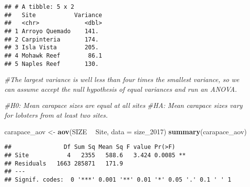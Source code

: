 \documentclass[]{article}
\newenvironment{Shaded}{\begin{snugshade}}{\end{snugshade}}
\newcommand{\KeywordTok}[1]{\textcolor[rgb]{0.13,0.29,0.53}{\textbf{#1}}}
\newcommand{\DataTypeTok}[1]{\textcolor[rgb]{0.13,0.29,0.53}{#1}}
\newcommand{\DecValTok}[1]{\textcolor[rgb]{0.00,0.00,0.81}{#1}}
\newcommand{\StringTok}[1]{\textcolor[rgb]{0.31,0.60,0.02}{#1}}
\newcommand{\CommentTok}[1]{\textcolor[rgb]{0.56,0.35,0.01}{\textit{#1}}}
\newcommand{\OperatorTok}[1]{\textcolor[rgb]{0.81,0.36,0.00}{\textbf{#1}}}
\newcommand{\NormalTok}[1]{#1}
\begin{document}
\begin{Shaded}
\end{Shaded}

\begin{verbatim}
## # A tibble: 5 x 2
##   Site           Variance
##   <chr>             <dbl>
## 1 Arroyo Quemado    141. 
## 2 Carpinteria       174. 
## 3 Isla Vista        205. 
## 4 Mohawk Reef        86.1
## 5 Naples Reef       130.
\end{verbatim}

\begin{Shaded}
\begin{Highlighting}[]
\CommentTok{#The largest variance is well less than four times the smallest variance, so we can assume accept the null hypothesis of equal variances and run an ANOVA.}

\CommentTok{#H0: Mean carapace sizes are equal at all sites}
\CommentTok{#HA: Mean carapace sizes vary for lobsters from at least two sites.}

\NormalTok{carapace_aov <-}\StringTok{ }\KeywordTok{aov}\NormalTok{(SIZE }\OperatorTok{~}\StringTok{ }\NormalTok{Site, }\DataTypeTok{data =}\NormalTok{ size_}\DecValTok{2017}\NormalTok{)}
\KeywordTok{summary}\NormalTok{(carapace_aov)}
\end{Highlighting}
\end{Shaded}

\begin{verbatim}
##               Df Sum Sq Mean Sq F value Pr(>F)   
## Site           4   2355   588.6   3.424 0.0085 **
## Residuals   1663 285871   171.9                  
## ---
## Signif. codes:  0 '***' 0.001 '**' 0.01 '*' 0.05 '.' 0.1 ' ' 1
\end{verbatim}
\end{document}
